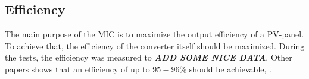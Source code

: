 \subsection{Efficiency}
The main purpose of the MIC is to maximize the output efficiency of a PV-panel. To achieve that, the efficiency of the converter itself should be maximized. During the tests, the efficiency was measured to \textbf{\textit{ADD SOME NICE DATA}}. Other papers shows that an efficiency of up to $95-96\%$ should be achievable\cite{underthehood}, \cite{efficient_buckboost}. 